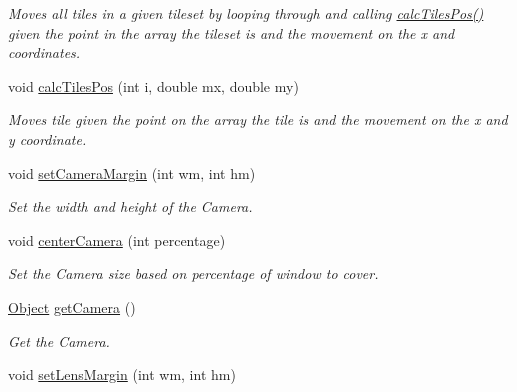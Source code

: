 \begin{DoxyCompactItemize}
\begin{DoxyCompactList}\small\item\em Moves all tiles in a given tileset by looping through and calling \hyperlink{classTileset_ad3601a9387ed892072e7c05a3b3081eb}{calc\+Tiles\+Pos()} given the point in the array the tileset is and the movement on the x and coordinates. \end{DoxyCompactList}\item 
void \hyperlink{classTileset_ad3601a9387ed892072e7c05a3b3081eb}{calc\+Tiles\+Pos} (int i, double mx, double my)\hypertarget{classTileset_ad3601a9387ed892072e7c05a3b3081eb}{}\label{classTileset_ad3601a9387ed892072e7c05a3b3081eb}

\begin{DoxyCompactList}\small\item\em Moves tile given the point on the array the tile is and the movement on the x and y coordinate. \end{DoxyCompactList}\item 
void \hyperlink{classTileset_ac731488d266bd1a46d0514ee52344fa9}{set\+Camera\+Margin} (int wm, int hm)\hypertarget{classTileset_ac731488d266bd1a46d0514ee52344fa9}{}\label{classTileset_ac731488d266bd1a46d0514ee52344fa9}

\begin{DoxyCompactList}\small\item\em Set the width and height of the Camera. \end{DoxyCompactList}\item 
void \hyperlink{classTileset_a07c27b0da0fe3da1737d03478f070b6b}{center\+Camera} (int percentage)\hypertarget{classTileset_a07c27b0da0fe3da1737d03478f070b6b}{}\label{classTileset_a07c27b0da0fe3da1737d03478f070b6b}

\begin{DoxyCompactList}\small\item\em Set the Camera size based on percentage of window to cover. \end{DoxyCompactList}\item 
\hyperlink{classObject}{Object} \hyperlink{classTileset_a1ca6be7ebfff987439c52224a48870c3}{get\+Camera} ()\hypertarget{classTileset_a1ca6be7ebfff987439c52224a48870c3}{}\label{classTileset_a1ca6be7ebfff987439c52224a48870c3}

\begin{DoxyCompactList}\small\item\em Get the Camera. \end{DoxyCompactList}\item 
void \hyperlink{classTileset_a6fe1de5d0b2f388521b85549c20b1dfb}{set\+Lens\+Margin} (int wm, int hm)\hypertarget{classTileset_a6fe1de5d0b2f388521b85549c20b1dfb}{}\label{classTileset_a6fe1de5d0b2f388521b85549c20b1dfb}


\end{DoxyCompactItemize}

